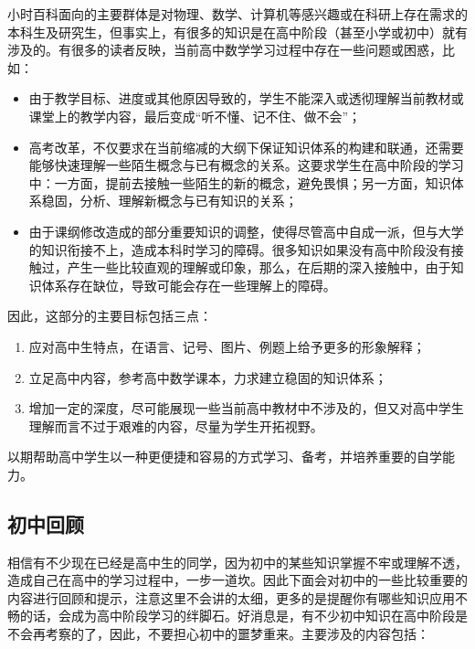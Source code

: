 
\begin{issues}
\issueDraft
\end{issues}

小时百科面向的主要群体是对物理、数学、计算机等感兴趣或在科研上存在需求的本科生及研究生，但事实上，有很多的知识是在高中阶段（甚至小学或初中）就有涉及的。有很多的读者反映，当前高中数学学习过程中存在一些问题或困惑，比如：
\begin{itemize}
\item 由于教学目标、进度或其他原因导致的，学生不能深入或透彻理解当前教材或课堂上的教学内容，最后变成“听不懂、记不住、做不会”；
\item 高考改革，不仅要求在当前缩减的大纲下保证知识体系的构建和联通，还需要能够快速理解一些陌生概念与已有概念的关系。这要求学生在高中阶段的学习中：一方面，提前去接触一些陌生的新的概念，避免畏惧；另一方面，知识体系稳固，分析、理解新概念与已有知识的关系；
\item 由于课纲修改造成的部分重要知识的调整，使得尽管高中自成一派，但与大学的知识衔接不上，造成本科时学习的障碍。很多知识如果没有高中阶段没有接触过，产生一些比较直观的理解或印象，那么，在后期的深入接触中，由于知识体系存在缺位，导致可能会存在一些理解上的障碍。
\end{itemize}

因此，这部分的主要目标包括三点：
\begin{enumerate}
\item 应对高中生特点，在语言、记号、图片、例题上给予更多的形象解释；
\item 立足高中内容，参考高中数学课本，力求建立稳固的知识体系；
\item 增加一定的深度，尽可能展现一些当前高中教材中不涉及的，但又对高中学生理解而言不过于艰难的内容，尽量为学生开拓视野。
\end{enumerate}
以期帮助高中学生以一种更便捷和容易的方式学习、备考，并培养重要的自学能力。

\subsection{初中回顾}

相信有不少现在已经是高中生的同学，因为初中的某些知识掌握不牢或理解不透，造成自己在高中的学习过程中，一步一道坎。因此下面会对初中的一些比较重要的内容进行回顾和提示，注意这里不会讲的太细，更多的是提醒你有哪些知识应用不畅的话，会成为高中阶段学习的绊脚石。好消息是，有不少初中知识在高中阶段是不会再考察的了，因此，不要担心初中的噩梦重来。主要涉及的内容包括：

